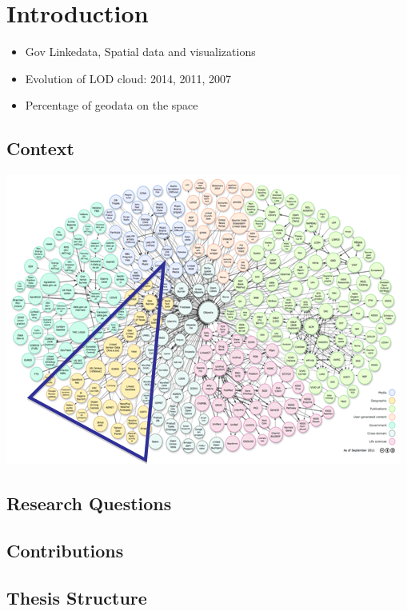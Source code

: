 \chapter{Introduction}
\label{intro}

\begin{itemize}
\item Gov Linkedata, Spatial data and visualizations
\item Evolution of LOD cloud: 2014, 2011, 2007
\item Percentage of geodata on the space
\end{itemize}

\section{Context}
\label{sec:context}



\includegraphics[scale=0.9]{img/lod-diagram-2011.png}


\section{Research Questions}
\label{sec:questions}

\section{Contributions}
\label{sec:contributions}

\section{Thesis Structure}
\label{sec:thesis-structure}